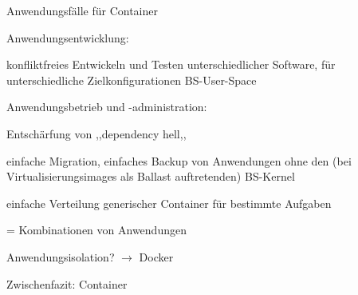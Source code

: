 \documentclass[a4paper]{article}
\begin{document}
\begin{multicols}{3}

    Anwendungsfälle für Container

    \begin{itemize*}
        \item Anwendungsentwicklung:
        \begin{itemize*}
            \item konfliktfreies Entwickeln und Testen unterschiedlicher Software, für unterschiedliche Zielkonfigurationen BS-User-Space
        \end{itemize*}
        \item Anwendungsbetrieb und -administration:
        \begin{itemize*}
            \item Entschärfung von ,,dependency hell,,
            \item einfache Migration, einfaches Backup von Anwendungen ohne den (bei Virtualisierungsimages als Ballast auftretenden) BS-Kernel
            \item einfache Verteilung generischer Container für bestimmte Aufgaben
            \item = Kombinationen von Anwendungen
        \end{itemize*}
        \item Anwendungsisolation? $\rightarrow$ Docker
    \end{itemize*}

    Zwischenfazit: Container


\end{multicols}
\end{document}
